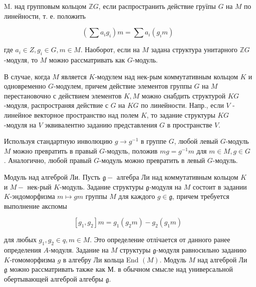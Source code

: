 \documentclass[10pt]{article}
\begin{document}
M. над групповым кольцом $\mathbb{Z} G$, если распространить действие груїпы $G$ на $M$ по линейности, т. е. положить



\[

\left(\sum a_{i} g_{i}\right) m=\sum a_{i}\left(g_{i} m\right)

\]



где $a_{i} \in Z, g_{i} \in G, m \in M$. Наоборот, если на $M$ задана структура унитарного $\mathbb{Z} G$-модуля, то $M$ можно рассматривать как $G$-модуль.



В случае, когда $M$ является $K$-модулем над нек-рым коммутативным кольцом $K$ и одновременно $G$-модулем, причем действие элементов группы $G$ на $M$ перестановочно с действием элементов $K, M$ можно снабдить структурой $K G$-модуля, распространяя действие с $G$ на $K G$ по линейности. Напр., если $V$ - линейное векторное пространство над полем $K$, то задание структуры $K G$-модуля на $V$ эквивалентно заданию представления $G$ в пространстве $V$.



Используя стандартную инволюцию $g \rightarrow g^{-1}$ в группе $G$, любой левый $G$-модуль $M$ можно превратить в правый $G$-модуль, положив $m g=g^{-1} m$ для $m \in M, g \in G$. Аналогично, любой правый $G$-модуль можно превратить в левый $G$-модуль.



Модуль над алгеброй Ли. Пусть $\mathfrak{g}-$ алгебра Ли над коммутативным кольцом $K$ и $M-$ нек-рый $K$-модуль. Задание структуры $\mathfrak{g}$-модуля на $M$ состоит в задании $K$-эндоморфизма $m \mapsto g m$ группы $M$ для каждого $g \in \mathfrak{g}$, причем требуется выполнение акспомы



\[

\left[g_{1}, g_{2}\right] m=g_{1}\left(g_{2} m\right)-g_{2}\left(g_{1} m\right)

\]



для любых $g_{1}, g_{2} \in q, m \in M$. Это определение отлічается от данного ранее определения $A$-модуля. Задание на $M$ структуры $\mathfrak{g}$-модуля равносильно заданию $K$-гомоморфизма $g$ в алгебру Ли кольца End $(M)$. Модуль $M$ над алгеброй Ли $\mathfrak{g}$ можно рассматривать также как М. в обычном смысле над универсальной обертывающей алгеброй алгебры $\mathfrak{g}$.
\end{document}
